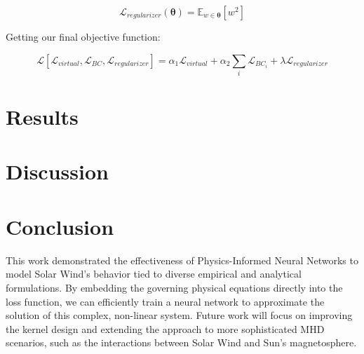 \documentclass[12pt]{article}
\begin{document}
\begin{equation}
    \mathcal{L}_{regularizer} \left( \mathbf{\theta} \right) = \mathbb{E}_{w \in \mathbf{\theta}}\left[ w ^ 2 \right]
\end{equation}

Getting our final objective function:

\begin{equation}
    \mathcal{L}\left[\mathcal{L}_{virtual}, \mathcal{L}_{BC}, \mathcal{L}_{regularizer}\right] = \alpha_1 \mathcal{L}_{virtual} + \alpha_2 \sum_{i} \mathcal{L}_{BC_i} + \lambda \mathcal{L}_{regularizer}
\end{equation}

\section{Results}

\section{Discussion}

\section{Conclusion}
This work demonstrated the effectiveness of Physics-Informed Neural Networks to model Solar Wind's behavior tied to diverse empirical and analytical formulations. By embedding the governing physical equations directly into the loss function, we can efficiently train a neural network to approximate the solution of this complex, non-linear system. Future work will focus on improving the kernel design and extending the approach to more sophisticated MHD scenarios, such as the interactions between Solar Wind and Sun's magnetosphere.




\end{document}
